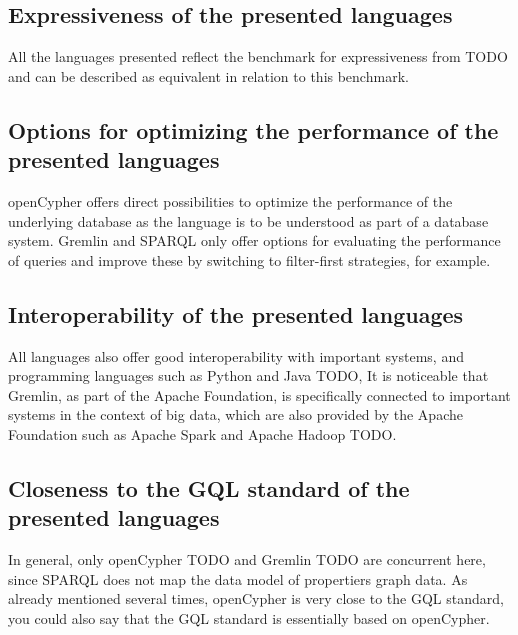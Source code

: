 \subsection{Expressiveness of the presented languages}
\label{subsec:conclusion:executive_summary:expressiveness}
All the languages presented reflect the benchmark for expressiveness from TODO 
and can be described as equivalent in relation to this benchmark.

\subsection{Options for optimizing the performance of the presented languages}
\label{subsec:conclusion:executive_summary:performance}
openCypher offers direct possibilities to optimize the performance of the underlying database 
as the language is to be understood as part of a database system.
Gremlin and SPARQL only offer options for evaluating the performance of queries and 
improve these by switching to filter-first strategies, for example.
\subsection{Interoperability of the presented languages}
\label{subsec:conclusion:executive_summary:interoperability}
All languages also offer good interoperability with important systems,
and programming languages such as Python and Java TODO, 
It is noticeable that Gremlin, as part of the Apache Foundation, is specifically connected to important
systems in the context of big data, which are also provided by the Apache Foundation
such as Apache Spark and Apache Hadoop TODO.
\subsection{Closeness to the GQL standard of the presented languages}
\label{subsec:conclusion:executive_summary:iso}
In general, only openCypher TODO and Gremlin TODO are concurrent here, since SPARQL does not map the 
data model of propertiers graph data. As already mentioned several times, 
openCypher is very close to the GQL standard, 
you could also say that the GQL standard is essentially based on openCypher.

